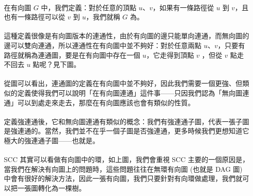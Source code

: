 \documentclass[12pt,a4paper,oneside]{report}
\begin{document}
\begin{CJK}{UTF8}{bkai}
\paragraph{}在有向圖 $G$ 中，我們定義：對於任意的頂點 $u$、$v$，如果有一條路徑從 $u$ 到 $v$，且也有一條路徑可以從 $v$ 到 $u$，我們就稱 $G$ 為\textbf{}。
\paragraph{}這種定義很像是有向圖版本的連通性，由於有向圖的邊只能單向連通，而無向圖的邊可以雙向連通，所以連通性在有向圖中並不夠好：對於任意兩點 $u$、$v$，只要有路徑就稱為連通圖，要是在有向圖中存在一個 $u$，它走得到頂點 $v$ ，但從 $v$ 點走不回去 $u$ 點呢？見下圖。
\paragraph{}從圖可以看出，連通圖的定義在有向圖中並不夠好，因此我們需要一個更強、但類似的定義使得我們可以說明「在有向圖連通」這件事------只因我們認為「無向圖連通」可以到處走來走去，那麼在有向圖應該也會有類似的性質。
\paragraph{}定義強連通後，它和無向圖連通有類似的概念：我們有強連通子圖，代表一張子圖是強連通的。當然，我們並不在乎一個子圖是否強連通，更多時候我們更想知道它極大的強連通子圖------也就是\textbf{}。
\paragraph{}SCC 其實可以看做有向圖中的環，如上圖，我們會重視 SCC 主要的一個原因是，當我們在解決有向圖上的問題時，這些問題往往在無環有向圖 (也就是 DAG 圖) 中會有很好的解決方法，因此一張有向圖，我們只要針對有向環做處理，我們就可以把一張圖轉化為一棵樹。


\end{CJK}
\end{document}
